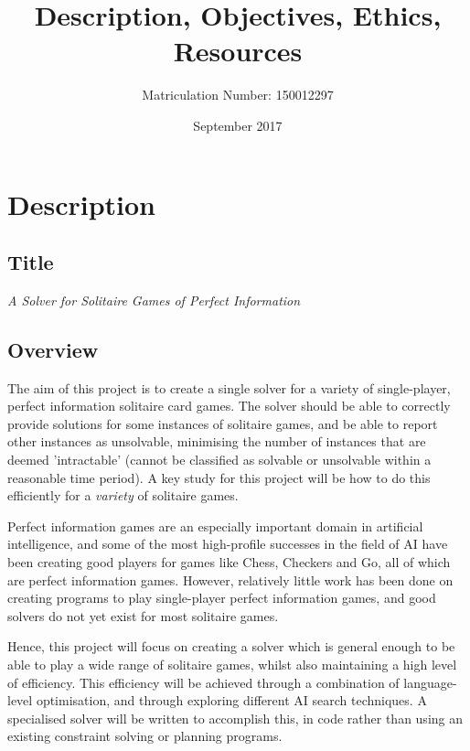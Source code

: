 \documentclass{article}
\title{Description, Objectives, Ethics, Resources}
\author{Matriculation Number: 150012297}
\date{September 2017}
\begin{document}
\maketitle

\section{Description}

\subsection{Title}

\vspace{2mm}

\emph{\large{A Solver for Solitaire Games of Perfect Information}}

\subsection{Overview}

The aim of this project is to create a single solver for a variety of
single-player, perfect information solitaire card games. The solver should be
able to correctly provide solutions for some instances of solitaire games, and
be able to report other instances as unsolvable, minimising the number of
instances that are deemed 'intractable' (cannot be classified as solvable or
unsolvable within a reasonable time period). A key study for this project will
be how to do this efficiently for a \emph{variety} of solitaire games.

Perfect information games are an especially important domain in artificial
intelligence, and some of the most high-profile successes in the field of AI
have been creating good players for games like Chess, Checkers and Go, all of
which are perfect information games. However, relatively little work has been
done on creating programs to play single-player perfect information games, and
good solvers do not yet exist for most solitaire games.

Hence, this project will focus on creating a solver which is general enough to
be able to play a wide range of solitaire games, whilst also maintaining a high
level of efficiency. This efficiency will be achieved through a combination of
language-level optimisation, and through exploring different AI search
techniques. A specialised solver will be written to accomplish this, in code
rather than using an existing constraint solving or planning programs.
\end{document}
